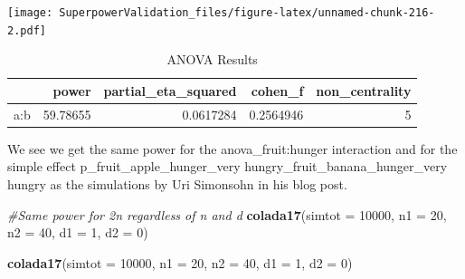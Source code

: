 \documentclass[
]{book}
\newenvironment{Shaded}{\begin{snugshade}}{\end{snugshade}}
\newcommand{\CommentTok}[1]{\textcolor[rgb]{0.56,0.35,0.01}{\textit{#1}}}
\newcommand{\DataTypeTok}[1]{\textcolor[rgb]{0.13,0.29,0.53}{#1}}
\newcommand{\DecValTok}[1]{\textcolor[rgb]{0.00,0.00,0.81}{#1}}
\newcommand{\FloatTok}[1]{\textcolor[rgb]{0.00,0.00,0.81}{#1}}
\newcommand{\KeywordTok}[1]{\textcolor[rgb]{0.13,0.29,0.53}{\textbf{#1}}}
\newcommand{\NormalTok}[1]{#1}
\newcommand{\OperatorTok}[1]{\textcolor[rgb]{0.81,0.36,0.00}{\textbf{#1}}}
\newcommand{\OtherTok}[1]{\textcolor[rgb]{0.56,0.35,0.01}{#1}}
\newcommand{\StringTok}[1]{\textcolor[rgb]{0.31,0.60,0.02}{#1}}
\begin{document}
\texttt{[image: SuperpowerValidation\_files/figure-latex/unnamed-chunk-216-2.pdf]}

\begin{Shaded}
\end{Shaded}

\begin{table}[!h]

\caption{\label{tab:unnamed-chunk-216}ANOVA Results}
\centering
\begin{tabular}[t]{l|r|r|r|r}
\hline
  & power & partial\_eta\_squared & cohen\_f & non\_centrality\\
\hline
a:b & 59.78655 & 0.0617284 & 0.2564946 & 5\\
\hline
\end{tabular}
\end{table}

We see we get the same power for the anova\_fruit:hunger interaction and for the simple effect p\_fruit\_apple\_hunger\_very hungry\_fruit\_banana\_hunger\_very hungry as the simulations by Uri Simonsohn in his blog post.

\begin{Shaded}
\begin{Highlighting}[]
\CommentTok{#Same power for 2n regardless of n and d}
\KeywordTok{colada17}\NormalTok{(}\DataTypeTok{simtot =} \DecValTok{10000}\NormalTok{, }\DataTypeTok{n1 =} \DecValTok{20}\NormalTok{, }\DataTypeTok{n2 =} \DecValTok{40}\NormalTok{, }\DataTypeTok{d1 =} \DecValTok{1}\NormalTok{, }\DataTypeTok{d2 =} \DecValTok{0}\NormalTok{)  }

\KeywordTok{colada17}\NormalTok{(}\DataTypeTok{simtot =} \DecValTok{10000}\NormalTok{, }\DataTypeTok{n1 =} \DecValTok{20}\NormalTok{, }\DataTypeTok{n2 =} \DecValTok{40}\NormalTok{, }\DataTypeTok{d1 =} \DecValTok{1}\NormalTok{, }\DataTypeTok{d2 =} \DecValTok{0}\NormalTok{) }
\end{Highlighting}
\end{Shaded}
\end{document}
